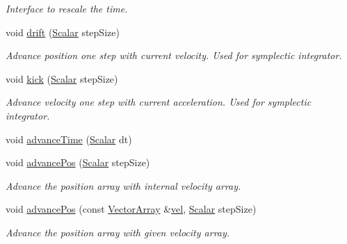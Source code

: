 \begin{DoxyCompactItemize}
\begin{DoxyCompactList}\small\item\em Interface to rescale the time. \end{DoxyCompactList}\item 
void \mbox{\hyperlink{class_space_h_1_1_particle_system_a9a0a562d544beab2b7ac4c964d641cea}{drift}} (\mbox{\hyperlink{class_space_h_1_1_particle_system_a522770dcfaf8b29aed35ea9348185a34}{Scalar}} step\+Size)
\begin{DoxyCompactList}\small\item\em Advance position one step with current velocity. Used for symplectic integrator. \end{DoxyCompactList}\item 
void \mbox{\hyperlink{class_space_h_1_1_particle_system_a329a15ac66d084537ff69345449f9f24}{kick}} (\mbox{\hyperlink{class_space_h_1_1_particle_system_a522770dcfaf8b29aed35ea9348185a34}{Scalar}} step\+Size)
\begin{DoxyCompactList}\small\item\em Advance velocity one step with current acceleration. Used for symplectic integrator. \end{DoxyCompactList}\item 
void \mbox{\hyperlink{class_space_h_1_1_particle_system_a60555ca2ed3ad323e736b5c810d93ad5}{advance\+Time}} (\mbox{\hyperlink{class_space_h_1_1_particle_system_a522770dcfaf8b29aed35ea9348185a34}{Scalar}} dt)
\item 
void \mbox{\hyperlink{class_space_h_1_1_particle_system_acdd6ab19e8a43161d4e508efd4f01d5c}{advance\+Pos}} (\mbox{\hyperlink{class_space_h_1_1_particle_system_a522770dcfaf8b29aed35ea9348185a34}{Scalar}} step\+Size)
\begin{DoxyCompactList}\small\item\em Advance the position array with internal velocity array. \end{DoxyCompactList}\item 
void \mbox{\hyperlink{class_space_h_1_1_particle_system_a9d29a47e00ceed6b77b5e0fec5b967f2}{advance\+Pos}} (const \mbox{\hyperlink{class_space_h_1_1_particle_system_acf48c66c8d42b85cd3a77911bb7da9ce}{Vector\+Array}} \&\mbox{\hyperlink{class_space_h_1_1_particle_system_a51c2aae4b2dd9d5aca3c15eb9116ff2d}{vel}}, \mbox{\hyperlink{class_space_h_1_1_particle_system_a522770dcfaf8b29aed35ea9348185a34}{Scalar}} step\+Size)
\begin{DoxyCompactList}\small\item\em Advance the position array with given velocity array. \end{DoxyCompactList}\item 

\end{DoxyCompactItemize}
